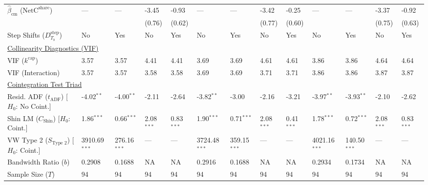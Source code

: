 \begin{table}[H]
\begin{tabular}{p{3.8cm}p{1.5cm}p{1.5cm}p{1.5cm}p{1.5cm}p{1.5cm}p{1.5cm}p{1.5cm}p{1.5cm}p{1.5cm}p{1.5cm}p{1.5cm}p{1.5cm}}
$\hat{\beta}_{\text{cm}}$ ($\text{NetC}^{\text{share}}$)  & --- & --- & -3.45 & -0.93 & --- & --- & -3.42 & -0.25 & --- & --- & -3.37 & -0.92  \\
 &  &  & {\scriptsize (0.76)} & {\scriptsize (0.62)} &  &  & {\scriptsize (0.77)} & {\scriptsize (0.60)} &  &  & {\scriptsize (0.75)} & {\scriptsize (0.63)}  \\
Step Shifts ($D^{\text{step}}_{T_b}$)  & No & Yes & No & Yes & No & Yes & No & Yes & No & Yes & No & Yes  \\
\midrule
\multicolumn{13}{l}{\underline{Collinearity Diagnostics (VIF)}} \\
VIF ($k^{\text{cap}}$) & 3.57 & 3.57 & 4.41 & 4.41 & 3.69 & 3.69 & 4.61 & 4.61 & 3.86 & 3.86 & 4.64 & 4.64  \\
VIF (Interaction) & 3.57 & 3.57 & 3.58 & 3.58 & 3.69 & 3.69 & 3.71 & 3.71 & 3.86 & 3.86 & 3.87 & 3.87  \\
\midrule
\multicolumn{13}{l}{\underline{Cointegration Test Triad}} \\
\makecell[l]{Resid. ADF ($t_{\text{ADF}}$) \\ {\scriptsize [$H_0$: No Coint.]}} & -4.02$^{**}$ & -4.00$^{**}$ & -2.11 & -2.64 & -3.82$^{**}$ & -3.00 & -2.16 & -3.21 & -3.97$^{**}$ & -3.93$^{**}$ & -2.10 & -2.62  \\
\makecell[l]{Shin LM ($C_{\text{Shin}}$) \\ {\scriptsize [$H_0$: Coint.]}} & 1.86$^{***}$ & 0.66$^{***}$ & 2.08$^{***}$ & 0.83$^{***}$ & 1.90$^{***}$ & 0.71$^{***}$ & 2.08$^{***}$ & 0.41$^{***}$ & 1.78$^{***}$ & 0.72$^{***}$ & 2.08$^{***}$ & 0.83$^{***}$  \\
\makecell[l]{VW Type 2 ($S_{\text{Type 2}}$) \\ {\scriptsize [$H_0$: Coint.]}} & 3910.69$^{***}$ & 276.16$^{***}$ & --- & --- & 3724.48$^{***}$ & 359.15$^{***}$ & --- & --- & 4021.16$^{***}$ & 140.50$^{***}$ & --- & ---  \\
\midrule
Bandwidth Ratio ($b$) & 0.2908 & 0.1688 & NA & NA & 0.2916 & 0.1688 & NA & NA & 0.2934 & 0.1734 & NA & NA  \\
Sample Size ($T$) & 94 & 94 & 94 & 94 & 94 & 94 & 94 & 94 & 94 & 94 & 94 & 94  \\
\bottomrule

\end{tabular}
\end{table}
